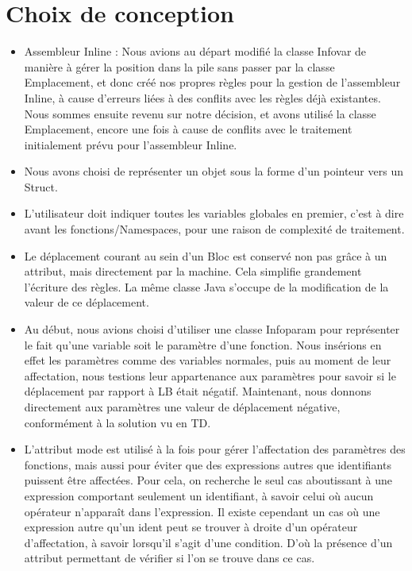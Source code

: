\documentclass{report}
\begin{document}
\chapter{Choix de conception}

\begin{itemize}
 	\item Assembleur Inline : Nous avions au départ modifié la classe Infovar de manière à gérer la position dans la pile sans passer par la classe Emplacement, et donc créé nos propres règles pour la gestion de l'assembleur Inline, à cause d'erreurs liées à des conflits avec les règles déjà existantes. Nous sommes ensuite revenu sur notre décision, et avons utilisé la classe Emplacement, encore une fois à cause de conflits avec le traitement initialement prévu pour l'assembleur Inline.\\
 	\item Nous avons choisi de représenter un objet sous la forme d'un pointeur vers un Struct.\\
 	\item L'utilisateur doit indiquer toutes les variables globales en premier, c'est à dire avant les fonctions/Namespaces, pour une raison de complexité de traitement.\\
 	\item Le déplacement courant au sein d’un Bloc est conservé non pas grâce à un attribut, mais directement par la machine. Cela simplifie grandement l’écriture des règles. La même classe Java s’occupe de la modification de la valeur de ce déplacement.\\
 	\item Au début, nous avions choisi d’utiliser une classe Infoparam pour représenter le fait qu’une variable soit le paramètre d’une fonction. Nous insérions en effet les paramètres comme des variables normales, puis au moment de leur affectation, nous testions leur appartenance aux paramètres pour savoir si le déplacement par rapport à LB était négatif. Maintenant, nous donnons directement aux paramètres une valeur de déplacement négative, conformément à la solution vu en TD.\\
 	\item L'attribut mode est utilisé à la fois pour gérer l'affectation des paramètres des fonctions, mais aussi pour éviter que des expressions autres que identifiants puissent être affectées. Pour cela, on recherche le seul cas aboutissant à une expression comportant seulement un identifiant, à savoir celui où aucun opérateur n'apparaît dans l'expression. Il existe cependant un cas où une expression autre qu’un ident peut se trouver à droite d’un opérateur d’affectation, à savoir lorsqu’il s’agit d’une condition. D’où la présence d’un attribut permettant de vérifier si l’on se trouve dans ce cas.\\

\end{itemize}
\end{document}
